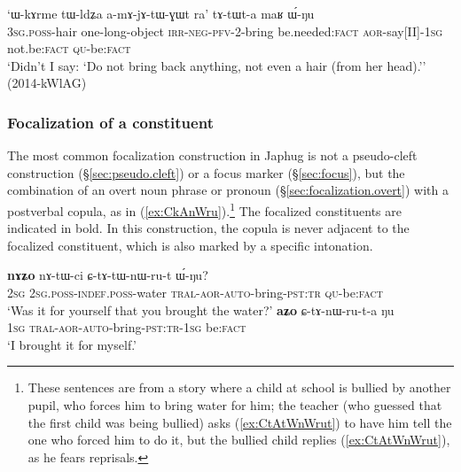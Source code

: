 \begin{exe}
\ex \label{ex:tAtWta.maR.WNu}
\gll `ɯ-kɤrme tɯ-ldʑa a-mɤ-jɤ-tɯ-ɣɯt ra' tɤ-tɯt-a maʁ ɯ́-ŋu \\
\textsc{3sg}.\textsc{poss}-hair one-long-object \textsc{irr}-\textsc{neg}-\textsc{pfv}-2-bring be.needed:\textsc{fact} \textsc{aor}-say[II]-\textsc{1sg} not.be:\textsc{fact} \textsc{qu}-be:\textsc{fact} \\
\glt `Didn't I say: `Do not bring back anything, not even a hair (from her head).'' (2014-kWlAG)
\end{exe}

\subsubsection{Focalization of a constituent} \label{sec:focalization.final.copula}
The most common focalization construction in Japhug is not a pseudo-cleft construction (§\ref{sec:pseudo.cleft}) or a focus marker (§\ref{sec:focus}), but the combination of an overt noun phrase or pronoun (§\ref{sec:focalization.overt}) with a postverbal copula, as in (\ref{ex:CkAnWru}).\footnote{These sentences are from a story where a child at school is bullied by another pupil, who forces him to bring water for him; the teacher (who guessed that the first child was being bullied) asks (\ref{ex:CtAtWnWrut}) to have him tell the one who forced him to do it, but the bullied child replies (\ref{ex:CtAtWnWrut}), as he fears reprisals.} The focalized constituents are indicated in bold. In this construction, the copula is never adjacent to the focalized constituent, which is also marked by a specific intonation. 

\begin{exe}
\ex  \label{ex:CkAnWru}
\begin{xlist}
\ex \label{ex:CtAtWnWrut}
\gll \textbf{nɤʑo} nɤ-tɯ-ci ɕ-tɤ-tɯ-nɯ-ru-t ɯ́-ŋu? \\
\textsc{2sg} \textsc{2sg}.\textsc{poss}-\textsc{indef}.\textsc{poss}-water \textsc{tral}-\textsc{aor}-\textsc{auto}-bring-\textsc{pst}:\textsc{tr}  \textsc{qu}-be:\textsc{fact} \\
\glt `Was it for yourself that you brought the water?'
\ex \label{ex:CtAnWruta}
\gll \textbf{aʑo} ɕ-tɤ-nɯ-ru-t-a ŋu \\
\textsc{1sg} \textsc{tral}-\textsc{aor}-\textsc{auto}-bring-\textsc{pst}:\textsc{tr}-\textsc{1sg} be:\textsc{fact} \\
\glt `I brought it for myself.'
\end{xlist}
\end{exe}


